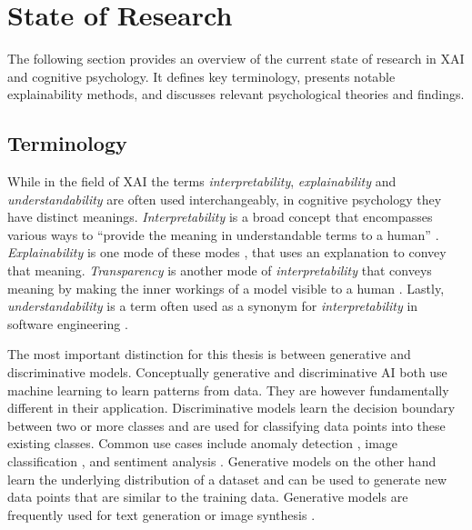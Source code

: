 \section{State of Research} \label{sec:state_of_research}

The following section provides an overview of the current state of research in \ac{XAI} and cognitive psychology. It defines key terminology, presents notable explainability methods, and discusses relevant psychological theories and findings.

\subsection{Terminology} \label{ssec:terminology}


While in the field of \ac{XAI} the terms \textit{interpretability}, \textit{explainability} and \textit{understandability} are often used interchangeably, in cognitive psychology they have distinct meanings. \textit{Interpretability} is a broad concept that encompasses various ways to “provide the meaning in understandable terms to a human” \parencite{Arieta2020}. \textit{Explainability} is one mode of these modes \parencite{Lipton2016}, that uses an explanation to convey that meaning. \textit{Transparency} is another mode of \textit{interpretability} that conveys meaning by making the inner workings of a model visible to a human \parencite{Arieta2020}. Lastly, \textit{understandability} is a term often used as a synonym for \textit{interpretability} in software engineering \parencite{Alonso2018}.

The most important distinction for this thesis is between generative and discriminative models. Conceptually generative and discriminative \ac{AI} both use machine learning to learn patterns from data. They are however fundamentally different in their application. Discriminative models learn the decision boundary between two or more classes and are used for classifying data points into these existing classes. Common use cases include anomaly detection \parencite{Edozie2025, Hilal2022}, image classification \parencite{Lu2007}, and sentiment analysis \parencite{Wankhade2022}. Generative models on the other hand learn the underlying distribution of a dataset and can be used to generate new data points that are similar to the training data. Generative models are frequently used for text generation \parencite{Brown2020} or image synthesis \parencite{Rombach2021}.

